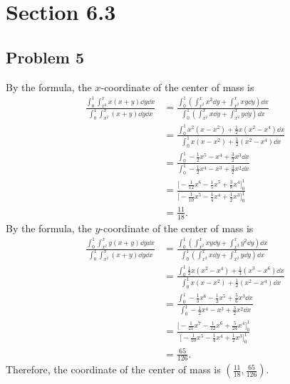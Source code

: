 \documentclass[11pt]{article}
\begin{document}

\section{Section 6.3}


\subsection*{Problem 5}

By the formula, the $x$-coordinate of the center of mass is
\begin{align*}
	\frac{\int_{0}^{1} \int_{x^{2}}^{x} x(x + y) \dd{y} \dd{x}}{\int_{0}^{1} \int_{x^{2}}^{x} (x + y) \dd{y} \dd{x}} &= \frac{\int_{0}^{1} \left(\int_{x^{2}}^{x} x^{2} \dd{y} + \int_{x^{2}}^{x} xy \dd{y} \right) \dd{x} }{\int_{0}^{1} \left(\int_{x^{2}}^{x} x \dd{y} + \int_{x^{2}}^{x} y \dd{y} \right) \dd{x}} \\
	&= \frac{\int_{0}^{1} x^{2}(x - x^{2}) + \tfrac{1}{2}x(x^{2} - x^{4}) \dd{x}}{\int_{0}^{1} x(x - x^{2}) + \tfrac{1}{2}(x^{2} - x^{4}) \dd{x}} \\
	&= \frac{\int_{0}^{1} -\tfrac{1}{2}x^{5} - x^{4} + \tfrac{3}{2}x^{3} \dd{x}}{\int_{0}^{1} -\tfrac{1}{2}x^{4} - x^{3} + \tfrac{3}{2}x^{2} \dd{x}} \\
	&= \frac{\Big[ -\tfrac{1}{12} x^{6} - \tfrac{1}{5}x^{5} + \tfrac{3}{8}x^{4} \Big]_{0}^{1}}{\Big[ -\tfrac{1}{10} x^{5} - \tfrac{1}{4}x^{4} + \tfrac{1}{2}x^{3} \Big]_{0}^{1}} \\
	&= \frac{11}{18}.
\end{align*}
By the formula, the $y$-coordinate of the center of mass is
\begin{align*}
	\frac{\int_{0}^{1} \int_{x^{2}}^{x} y(x + y) \dd{y} \dd{x}}{\int_{0}^{1} \int_{x^{2}}^{x} (x + y) \dd{y} \dd{x}} &= \frac{\int_{0}^{1} \left(\int_{x^{2}}^{x} xy \dd{y} + \int_{x^{2}}^{x} y^{2} \dd{y} \right) \dd{x} }{\int_{0}^{1} \left(\int_{x^{2}}^{x} x \dd{y} + \int_{x^{2}}^{x} y \dd{y} \right) \dd{x}} \\
	&= \frac{\int_{0}^{1} \tfrac{1}{2}x (x^{2} - x^{4}) + \tfrac{1}{3}(x^{3} - x^{6}) \dd{x}}{\int_{0}^{1} x(x - x^{2}) + \tfrac{1}{2}(x^{2} - x^{4}) \dd{x}} \\
	&= \frac{\int_{0}^{1} -\tfrac{1}{3}x^{6} - \tfrac{1}{2}x^{5} + \tfrac{5}{6}x^{3} \dd{x}}{\int_{0}^{1} -\tfrac{1}{2}x^{4} - x^{3} + \tfrac{3}{2}x^{2} \dd{x}} \\
	&= \frac{\Big[ -\tfrac{1}{21} x^{7} - \tfrac{1}{12} x^{6} + \tfrac{5}{24} x^{4} \Big]_{0}^{1}}{\Big[ -\tfrac{1}{10}x^{5} - \tfrac{1}{4}x^{4} + \tfrac{1}{2}x^{3} \Big]_{0}^{1}} \\
	&= \frac{65}{126}.
\end{align*}
Therefore, the coordinate of the center of mass is $\boxed{\left( \frac{11}{18}, \frac{65}{126} \right)}$.
\end{document}
